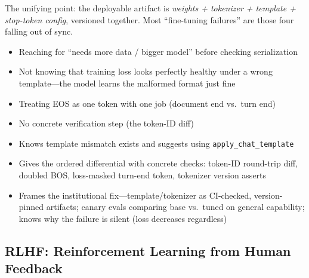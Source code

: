 \begin{interviewq}
The unifying point: the deployable artifact is \emph{weights + tokenizer + template + stop-token config}, versioned together. Most ``fine-tuning failures'' are those four falling out of sync.

\redflags
\begin{itemize}
    \item Reaching for ``needs more data / bigger model'' before checking serialization
    \item Not knowing that training loss looks perfectly healthy under a wrong template---the model learns the malformed format just fine
    \item Treating EOS as one token with one job (document end vs.\ turn end)
    \item No concrete verification step (the token-ID diff)
\end{itemize}


\goodgreat
\begin{itemize}
    \item {} Knows template mismatch exists and suggests using \texttt{apply\_chat\_template}
    \item {} Gives the ordered differential with concrete checks: token-ID round-trip diff, doubled BOS, loss-masked turn-end token, tokenizer version asserts
    \item {} Frames the institutional fix---template/tokenizer as CI-checked, version-pinned artifacts; canary evals comparing base vs.\ tuned on general capability; knows why the failure is silent (loss decreases regardless)
\end{itemize}

\end{interviewq}

\subsection{RLHF: Reinforcement Learning from Human Feedback}

